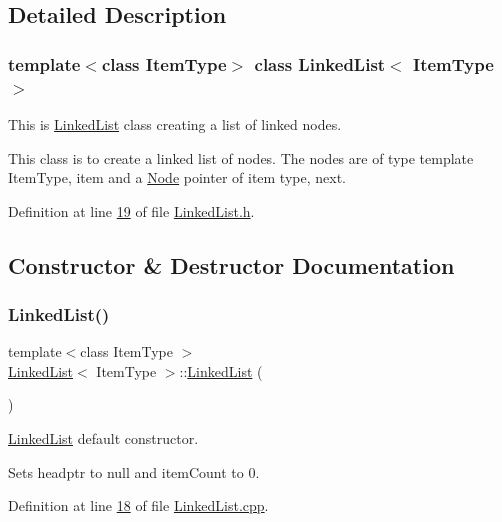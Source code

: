 \subsection{Detailed Description}
\subsubsection*{template$<$class Item\+Type$>$\newline
class Linked\+List$<$ Item\+Type $>$}

This is \hyperlink{classLinkedList}{Linked\+List} class creating a list of linked nodes. 

This class is to create a linked list of nodes. The nodes are of type template Item\+Type, item and a \hyperlink{classNode}{Node} pointer of item type, next. 

Definition at line \hyperlink{LinkedList_8h_source_l00019}{19} of file \hyperlink{LinkedList_8h_source}{Linked\+List.\+h}.



\subsection{Constructor \& Destructor Documentation}
\mbox{\label{classLinkedList_adf8d8164e06b6d358a36df7e53e814ee}} 
\subsubsection{\texorpdfstring{Linked\+List()}{LinkedList()}\hspace{0.1cm}{\footnotesize\ttfamily [1/2]}}
{\footnotesize\ttfamily template$<$class Item\+Type $>$ \\
\hyperlink{classLinkedList}{Linked\+List}$<$ Item\+Type $>$\+::\hyperlink{classLinkedList}{Linked\+List} (\begin{DoxyParamCaption}{ }\end{DoxyParamCaption})}



\hyperlink{classLinkedList}{Linked\+List} default constructor. 

Sets headptr to null and item\+Count to 0. 

Definition at line \hyperlink{LinkedList_8cpp_source_l00018}{18} of file \hyperlink{LinkedList_8cpp_source}{Linked\+List.\+cpp}.


